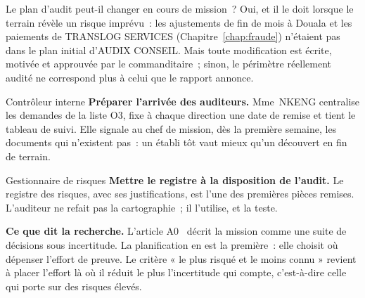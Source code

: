 \begin{boiteRemarque}{Le plan d'audit peut-il changer en cours de mission~?}
Oui, et il le doit lorsque le terrain révèle un risque imprévu~: les
ajustements de fin de mois à Douala et les paiements de TRANSLOG SERVICES
(Chapitre~\ref{chap:fraude}) n'étaient pas dans le plan initial d'AUDIX
CONSEIL. Mais toute modification est écrite, motivée et approuvée par le
commanditaire~; sinon, le périmètre réellement audité ne correspond plus à
celui que le rapport annonce.
\end{boiteRemarque}

\begin{boxmetier}{Contrôleur interne}
\textbf{Préparer l'arrivée des auditeurs.} Mme~NKENG centralise les
demandes de la liste O3, fixe à chaque direction une date de remise et tient
le tableau de suivi. Elle signale au chef de mission, dès la première
semaine, les documents qui n'existent pas~: un \NON{} établi tôt vaut mieux
qu'un \NEK{} découvert en fin de terrain.
\end{boxmetier}

\begin{boxmetier}{Gestionnaire de risques}
\textbf{Mettre le registre à la disposition de l'audit.} Le registre des
risques, avec ses justifications, est l'une des premières pièces remises.
L'auditeur ne refait pas la cartographie~; il l'utilise, et la teste.
\end{boxmetier}

\begin{boxinfo}
\textbf{Ce que dit la recherche.} L'article A0~\cite{minka2026auditologie}
décrit la mission comme une suite de décisions sous incertitude. La
planification en est la première~: elle choisit où dépenser l'effort de
preuve. Le critère « le plus risqué et le moins connu » revient à placer
l'effort là où il réduit le plus l'incertitude qui compte, c'est-à-dire
celle qui porte sur des risques élevés.
\end{boxinfo}

\separateur

